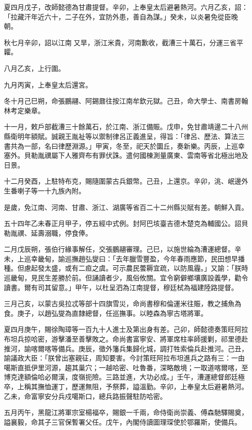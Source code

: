\begin{pinyinscope}
夏四月戊子，改師懿德為甘肅提督。辛卯，上奉皇太后避暑熱河。六月乙亥，詔：「拉藏汗年近六十，二子在外，宜防外患，善自為謀。」癸未，以炎暑免從臣晚朝。

秋七月辛卯，詔以江南又旱，浙江米貴，河南歉收，截漕三十萬石，分運三省平糶。

八月乙亥，上行圍。

九月丙寅，上奉皇太后還宮。

冬十月己巳朔，命張鵬翮、阿錫鼐往按江南牟欽元獄。己丑，命大學士、南書房翰林考定樂章。

十一月，敕戶部截漕三十餘萬石，於江南、浙江備賑。戊申，免甘肅靖邊二十八州縣衛明年額賦。誠親王胤祉等以禦制律呂正義進呈，得旨：「律呂、歷法、算法三書共為一部，名曰律歷淵源。」甲寅，冬至，祀天於圜丘，奏新樂。丙辰，上巡幸塞外。貝勒胤禩屬下人雅齊布有罪伏誅。遣何國棟測量廣東、雲南等省北極出地及日景。

十二月癸酉，上駐特布克，賜隨圍蒙古兵銀幣。己丑，上還京。辛卯，洮、岷邊外生番喇子等一十九族內附。

是歲，免江南、河南、甘肅、浙江、湖廣等省百二十二州縣災賦有差。朝鮮入貢。

五十四年乙未春正月甲子，停五經中式例。封阿巴垓臺吉德木楚克為輔國公。詔貝勒胤禩、延壽溺職，停食俸。

二月戊辰朔，張伯行緣事解任，交張鵬翮審理。己巳，以施世綸為漕運總督。辛未，上巡幸畿甸，諭巡撫趙弘燮曰：「去年臘雪豐盈，今年春雨應節，民田想早播種。但慮起發太盛，或有二疸之虞。可示農民蕓耨宜疏，以防風霾。」又諭：「朕時巡畿甸，見民生差勝於前。但誦讀者少，風俗攸關。宜令窮僻鄉壤廣設義學，勸令讀書。爾有司其留意。」甲午，以杜呈泗為江南提督，穆廷栻為福建陸路提督。

三月己亥，以蒙古吳拉忒等部十四旗雪災，命尚書穆和倫運米往賑，教之捕魚為食。庚子，以趙弘燮為直隸總督，任巡撫事。以睦森為寧古塔將軍。

夏四月庚午，賜徐陶璋等一百九十人進士及第出身有差。己卯，師懿德奏策旺阿拉布坦兵掠哈密，游擊潘至善擊敗之。命尚書富寧安、將軍席柱率師援剿，祁里德赴推河，諭喀爾喀等備兵。庚辰，徵外籓兵集歸化城，調打牲索倫兵赴推河。己丑，諭議政大臣：「朕曾出塞親征，周知要害。今討策旺阿拉布坦進兵之路有三：一由噶斯直抵伊里河源，趨其巢穴；一越哈密、吐魯番，深略敵境；一取道喀爾喀，至博克達額倫哈必爾漢，度嶺扼險。三路並進，大功必成。」壬午，漕運總督郎廷極卒，上稱其撫恤運丁，歷運無阻，予祭葬，謚溫勤。辛卯，上奉皇太后避暑熱河。乙未，命富寧安分兵戍噶斯口，總兵路振聲駐防哈密。

五月丙午，黑龍江將軍宗室楊福卒，賜銀一千兩，命侍衛尚崇義、傅森馳驛賜奠，謚襄毅，命其子三官保暫署父任。戊午，內閣侍讀圖理琛使於鄂羅斯，使備兵。


\end{pinyinscope}
